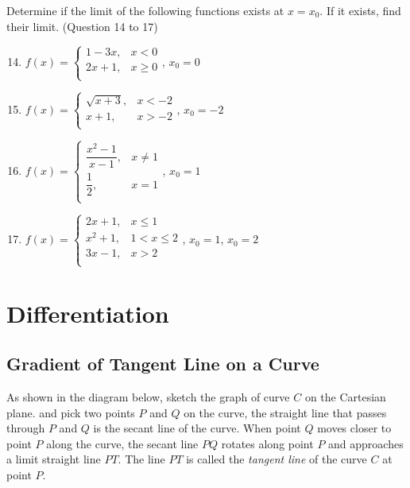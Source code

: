 \documentclass[12pt]{report}
\begin{document}
\begin{multicols}{2}
  \noindent Determine if the limit of the following functions exists at $x = x_0$. If it exists, find their limit. (Question 14 to 17)
  \begin{enumerate}
    \setcounter{enumi}{13}
    \item $f (x) = \left\{\begin{array}{rl}
              1-3x, & x < 0    \\
              2x+1, & x \geq 0 \\
            \end{array}\right.$, $x_0 = 0$
    \item $f (x) = \left\{\begin{array}{rl}
              \sqrt{x+3}, & x < -2 \\
              x+1,        & x > -2 \\
            \end{array}\right.$, $x_0 = -2$
    \item $f (x) = \left\{\begin{array}{rl}
              \dfrac{x^2 - 1}{x-1}, & x \neq 1 \\
              \dfrac{1}{2},         & x = 1    \\
            \end{array}\right.$, $x_0 = 1$
    \item $f (x) = \left\{\begin{array}{rl}
              2x + 1,  & x \leq 1     \\
              x^2 + 1, & 1 < x \leq 2 \\
              3x - 1,  & x > 2        \\
            \end{array}\right.$, $x_0 = 1$, $x_0 = 2$
  \end{enumerate}
\end{multicols}

\chapter{Differentiation}

\section{Gradient of Tangent Line on a Curve}

As shown in the diagram below, sketch the graph of curve $C$ on the Cartesian
plane. and pick two points $P$ and $Q$ on the curve, the straight line that
passes through $P$ and $Q$ is the secant line of the curve. When point $Q$
moves closer to point $P$ along the curve, the secant line $PQ$ rotates along
point $P$ and approaches a limit straight line $PT$. The line $PT$ is called
the \textit{tangent line} of the curve $C$ at point $P$.
\end{document}
